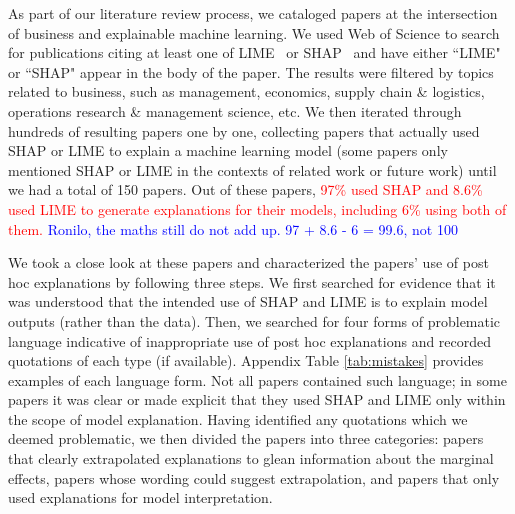 \documentclass[mnsc,blindrev]{informs3}
\begin{document}
        As part of our literature review process, we cataloged papers at the intersection of business and explainable machine learning. We used Web of Science to search for publications citing at least one of LIME~\citep{ribeiro16lime} or SHAP~\citep{lundberg17shap} and have either ``LIME" or ``SHAP" appear in the body of the paper.  The results were filtered by topics related to business, such as management, economics, supply chain \& logistics, operations research \& management science, etc. 
        We then iterated through hundreds of resulting papers one by one, collecting papers that actually used SHAP or LIME to explain a machine learning model (some papers only mentioned SHAP or LIME in the contexts of related work or future work) until we had a total of 150 papers. Out of these papers, \textcolor{red}{97\% used SHAP and 8.6\% used LIME to generate explanations for their models, including 6\% using both of them.} \textcolor{blue}{Ronilo, the maths still do not add up. 97 + 8.6 - 6 = 99.6, not 100}

        
        We took a close look at these papers and characterized the papers' use of post hoc explanations by following three steps. We first searched for evidence that it was understood that the intended use of SHAP and LIME is to explain model outputs (rather than the data). Then, we searched for four forms of problematic language indicative of inappropriate use of post hoc explanations and recorded quotations of each type (if available). Appendix Table \ref{tab:mistakes} provides examples of each language form. Not all papers contained such language; in some papers it was clear or made explicit that they used SHAP and LIME only within the scope of model explanation. Having identified any quotations which we deemed problematic, we then divided the papers into three categories: papers that clearly extrapolated explanations to glean information about the marginal effects, papers whose wording could suggest extrapolation, and papers that only used explanations for model interpretation.%
\end{document}
